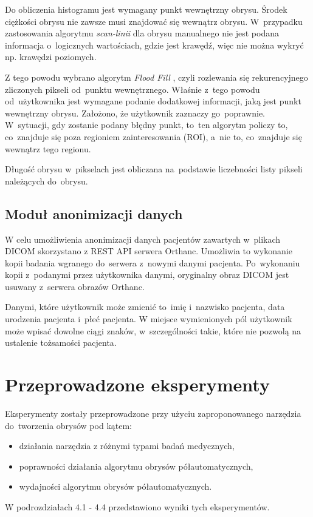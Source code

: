 \documentclass[a4paper,11pt,twoside,openright]{report}
\newcommand\blankpage{%
    \null
    \thispagestyle{empty}%
    \newpage}
\theoremstyle{definition}
\begin{document}
Do obliczenia histogramu jest wymagany punkt wewnętrzny obrysu. Środek ciężkości
obrysu nie zawsze musi znajdować się wewnątrz obrysu. W~przypadku zastosowania
algorytmu \textit{scan-linii} \cite{GK1} dla obrysu manualnego nie jest podana informacja o~logicznych
wartościach, gdzie jest krawędź, więc nie można wykryć np. krawędzi poziomych.

Z tego powodu wybrano algorytm \textit{Flood Fill} \cite{AiSD2}, czyli rozlewania się rekurencyjnego %
zliczonych pikseli od~punktu wewnętrznego. Właśnie z~tego powodu od~użytkownika
jest wymagane podanie dodatkowej informacji, jaką jest punkt wewnętrzny obrysu.
Założono, że użytkownik zaznaczy go~poprawnie. W~sytuacji, gdy zostanie podany
błędny punkt, to~ten algorytm policzy to, co~znajduje się poza regioniem zainteresowania (ROI),
a~nie to, co~znajduje się wewnątrz tego regionu.

Długość obrysu w~pikselach jest obliczana na~podstawie liczebności listy pikseli należących do~obrysu.

\section {Moduł anonimizacji danych}

W celu umożliwienia anonimizacji danych pacjentów zawartych w~plikach DICOM skorzystano
z REST API serwera Orthanc. Umożliwia to wykonanie kopii badania wgranego do~serwera
z~nowymi danymi pacjenta. Po~wykonaniu kopii z~podanymi przez użytkownika danymi,
oryginalny obraz DICOM jest usuwany z~serwera obrazów Orthanc.

Danymi, które użytkownik może zmienić to~imię i~nazwisko pacjenta, data urodzenia pacjenta
i~płeć pacjenta. W miejsce wymienionych pól użytkownik może wpisać dowolne ciągi
znaków, w~szczególności takie, które nie pozwolą na ustalenie tożsamości pacjenta.

\afterpage{\blankpage}

\chapter {Przeprowadzone eksperymenty}

Eksperymenty zostały przeprowadzone przy użyciu zaproponowanego narzędzia
do~tworzenia obrysów pod kątem:
\begin{itemize}[noitemsep]
\item działania narzędzia z różnymi typami badań medycznych,
\item poprawności działania algorytmu obrysów półautomatycznych,
\item wydajności algorytmu obrysów półautomatycznych.
\end{itemize}
W podrozdziałach 4.1 - 4.4 przedstawiono wyniki tych eksperymentów.
\end{document}
